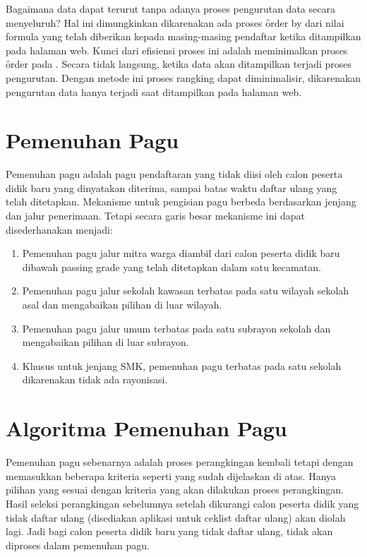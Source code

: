 Bagaimana data dapat terurut tanpa adanya proses pengurutan data secara
menyeluruh? Hal ini dimungkinkan dikarenakan ada proses \f{order by} dari nilai
formula yang telah diberikan kepada masing-masing pendaftar ketika ditampilkan
pada halaman web.  Kunci dari efisiensi proses ini adalah meminimalkan proses
\f{order} pada \database.  Secara tidak langsung, ketika data akan ditampilkan
terjadi proses pengurutan.  Dengan metode ini proses rangking dapat
diminimalisir, dikarenakan pengurutan data hanya terjadi saat ditampilkan pada
halaman web.


\section{Pemenuhan Pagu}
\label{sec:pemenuhan_pagu}

Pemenuhan pagu adalah pagu pendaftaran yang tidak diisi oleh calon peserta
didik baru yang dinyatakan diterima, sampai batas waktu daftar ulang yang telah
ditetapkan. Mekanisme untuk pengisian pagu berbeda berdasarkan jenjang dan
jalur penerimaan. Tetapi secara garis besar mekanisme ini dapat disederhanakan
menjadi:

\begin{enumerate} 
  \item Pemenuhan pagu jalur mitra warga diambil dari calon peserta didik baru
    dibawah passing grade yang telah ditetapkan dalam satu kecamatan.
  \item Pemenuhan pagu jalur sekolah kawasan terbatas pada satu wilayah sekolah
    asal dan mengabaikan pilihan di luar wilayah.
  \item Pemenuhan pagu jalur umum terbatas pada satu subrayon sekolah dan
    mengabaikan pilihan di luar subrayon.
  \item Khusus untuk jenjang SMK, pemenuhan pagu terbatas pada satu sekolah
    dikarenakan tidak ada rayonisasi.
\end{enumerate}


\section{Algoritma Pemenuhan Pagu}
\label{sec:algoritma_pemenuhan_pagu}

Pemenuhan pagu sebenarnya adalah proses perangkingan kembali tetapi dengan
memasukkan beberapa kriteria seperti yang sudah dijelaskan di atas. Hanya
pilihan yang sesuai dengan kriteria yang akan dilakukan proses perangkingan.
Hasil seleksi perangkingan sebelumnya setelah dikurangi calon peserta didik
yang tidak daftar ulang (disediakan aplikasi untuk ceklist daftar ulang) akan
diolah lagi. Jadi bagi calon peserta didik baru yang tidak daftar ulang, tidak
akan diproses dalam pemenuhan pagu.

